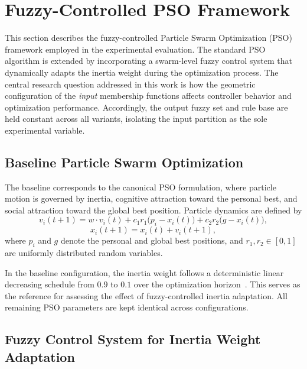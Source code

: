 \section{Fuzzy-Controlled PSO Framework}
\label{sec:framework}

This section describes the fuzzy-controlled Particle Swarm Optimization (PSO) framework employed in the experimental evaluation. The standard PSO algorithm is extended by incorporating a swarm-level fuzzy control system that dynamically adapts the inertia weight during the optimization process. The central research question addressed in this work is how the geometric configuration of the \emph{input} membership functions affects controller behavior and optimization performance. Accordingly, the output fuzzy set and rule base are held constant across all variants, isolating the input partition as the sole experimental variable.

\subsection{Baseline Particle Swarm Optimization}
\label{subsec:baseline_pso}

The baseline corresponds to the canonical PSO formulation, where particle motion is governed by inertia, cognitive attraction toward the personal best, and social attraction toward the global best position. Particle dynamics are defined by
\begin{equation}
    v_i(t{+}1) = w \cdot v_i(t) + c_1 r_1 \bigl(p_i - x_i(t)\bigr) + c_2 r_2 \bigl(g - x_i(t)\bigr),
    \label{eq:pso_velocity}
\end{equation}
\begin{equation}
    x_i(t{+}1) = x_i(t) + v_i(t{+}1),
    \label{eq:pso_position}
\end{equation}
where $p_i$ and $g$ denote the personal and global best positions, and $r_1, r_2 \in [0,1]$ are uniformly distributed random variables.

In the baseline configuration, the inertia weight follows a deterministic linear decreasing schedule from $0.9$ to $0.1$ over the optimization horizon~\cite{abualigah2021arithmetic}. This serves as the reference for assessing the effect of fuzzy-controlled inertia adaptation. All remaining PSO parameters are kept identical across configurations.

\subsection{Fuzzy Control System for Inertia Weight Adaptation}
\label{subsec:fcs}

